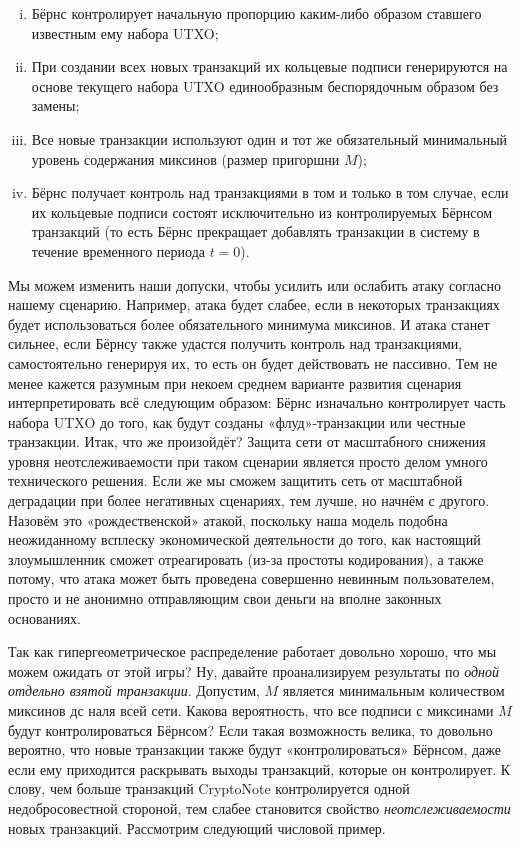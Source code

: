 \documentclass{mrl}
\begin{document}
\begin{enumerate}[(i)]
\item Бёрнс контролирует начальную пропорцию каким-либо образом ставшего известным ему набора UTXO;
\item При создании всех новых транзакций их кольцевые подписи генерируются на основе текущего набора UTXO единообразным беспорядочным образом без замены;
\item Все новые транзакции используют один и тот же обязательный минимальный уровень содержания миксинов (размер пригоршни $M$);
\item Бёрнс получает контроль над транзакциями в том и только в том случае, если их кольцевые подписи состоят исключительно из контролируемых Бёрнсом транзакций (то есть Бёрнс прекращает добавлять транзакции в систему в течение временного периода $t=0$).
\end{enumerate}

Мы можем изменить наши допуски, чтобы усилить или ослабить атаку согласно нашему сценарию. Например, атака будет слабее, если в некоторых транзакциях будет использоваться более обязательного минимума миксинов. И атака станет сильнее, если Бёрнсу также удастся получить контроль над транзакциями, самостоятельно генерируя их, то есть он будет действовать не пассивно. Тем не менее кажется разумным при некоем среднем варианте развития сценария интерпретировать всё следующим образом: Бёрнс изначально контролирует часть набора UTXO до того, как будут созданы «флуд»-транзакции или честные транзакции. Итак, что же произойдёт? Защита сети от масштабного снижения уровня неотслеживаемости при таком сценарии является просто делом умного технического решения. Если же мы сможем защитить сеть от масштабной деградации при более негативных сценариях, тем лучше, но начнём с другого. Назовём это «рождественской» атакой, поскольку наша модель подобна неожиданному всплеску экономической деятельности до того, как настоящий злоумышленник сможет отреагировать (из-за простоты кодирования), а также потому, что атака может быть проведена совершенно невинным пользователем, просто и не анонимно отправляющим свои деньги на вполне законных основаниях.

Так как гипергеометрическое распределение работает довольно хорошо, что мы можем ожидать от этой игры? Ну, давайте проанализируем результаты по \emph{одной отдельно взятой транзакции}. Допустим, $M$ является минимальным количеством миксинов дс наля всей сети. Какова вероятность, что все подписи с миксинами $M$ будут контролироваться Бёрнсом? Если такая возможность велика, то довольно вероятно, что новые транзакции также будут «контролироваться» Бёрнсом, даже если ему приходится раскрывать выходы транзакций, которые он контролирует. К слову, чем больше транзакций CryptoNote контролируется одной недобросовестной стороной, тем слабее становится свойство \emph{неотслеживаемости} новых транзакций. Рассмотрим следующий числовой пример.
\end{document}
